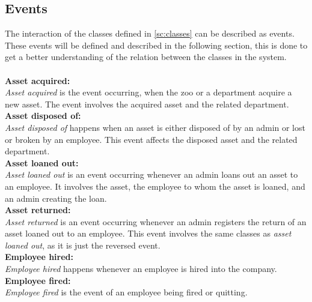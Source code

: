 \subsection{Events}\label{ssc:events}
The interaction of the classes defined in \autoref{sc:classes} can be described as events. These events will be defined and described in the following section, this is done to get a better understanding of the relation between the classes in the system. \\\\

\textbf{Asset acquired:}\\
\textit{Asset acquired} is the event occurring, when the zoo or a department acquire a new asset. The event involves the acquired asset and the related department.\\

\textbf{Asset disposed of:}\\
\textit{Asset disposed of} happens when an asset is either disposed of by an admin or lost or broken by an employee. This event affects the disposed asset and the related department. \\

\textbf{Asset loaned out:}\\
\textit{Asset loaned out} is an event occurring whenever an admin loans out an asset to an employee. It involves the asset, the employee to whom the asset is loaned, and an admin creating the loan.\\

\textbf{Asset returned:}\\
\textit{Asset returned} is an event occurring whenever an admin registers the return of an asset loaned out to an employee. This event involves the same classes as \textit{asset loaned out}, as it is just the reversed event.\\

\textbf{Employee hired:}\\
\textit{Employee hired} happens whenever an employee is hired into the company. \\

\textbf{Employee fired:}\\
\textit{Employee fired} is the event of an employee being fired or quitting.\\

